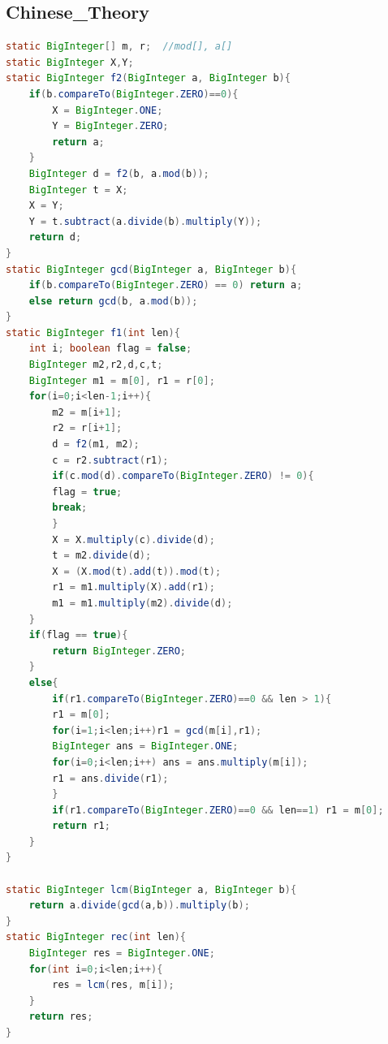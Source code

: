\documentclass[twocolumn]{article}
\begin{document}
\begin{twocolumn}
\subsection{Chinese\_Theory}
\begin{lstlisting}[language={Java}]
static BigInteger[] m, r;  //mod[], a[]
static BigInteger X,Y;
static BigInteger f2(BigInteger a, BigInteger b){
	if(b.compareTo(BigInteger.ZERO)==0){
	    X = BigInteger.ONE;
	    Y = BigInteger.ZERO;
	    return a;
	}
	BigInteger d = f2(b, a.mod(b));
	BigInteger t = X;
	X = Y;
	Y = t.subtract(a.divide(b).multiply(Y));
	return d;
}
static BigInteger gcd(BigInteger a, BigInteger b){
	if(b.compareTo(BigInteger.ZERO) == 0) return a;
	else return gcd(b, a.mod(b));
}
static BigInteger f1(int len){
	int i; boolean flag = false;
	BigInteger m2,r2,d,c,t;
	BigInteger m1 = m[0], r1 = r[0];
	for(i=0;i<len-1;i++){
	    m2 = m[i+1];
	    r2 = r[i+1];
	    d = f2(m1, m2);
	    c = r2.subtract(r1);
	    if(c.mod(d).compareTo(BigInteger.ZERO) != 0){
		flag = true;
		break;
	    }
	    X = X.multiply(c).divide(d);
	    t = m2.divide(d);
	    X = (X.mod(t).add(t)).mod(t);
	    r1 = m1.multiply(X).add(r1);
	    m1 = m1.multiply(m2).divide(d);
	}
	if(flag == true){
	    return BigInteger.ZERO;
	}
	else{
	    if(r1.compareTo(BigInteger.ZERO)==0 && len > 1){
		r1 = m[0];
		for(i=1;i<len;i++)r1 = gcd(m[i],r1);
		BigInteger ans = BigInteger.ONE;
		for(i=0;i<len;i++) ans = ans.multiply(m[i]);
		r1 = ans.divide(r1);
	    }
	    if(r1.compareTo(BigInteger.ZERO)==0 && len==1) r1 = m[0];
	    return r1;
	}
}

static BigInteger lcm(BigInteger a, BigInteger b){
	return a.divide(gcd(a,b)).multiply(b);
}
static BigInteger rec(int len){
	BigInteger res = BigInteger.ONE;
	for(int i=0;i<len;i++){
	    res = lcm(res, m[i]);
	}
	return res;
}
\end{lstlisting}



\end{twocolumn}
\end{document}
